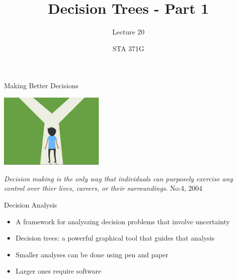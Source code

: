 \documentclass{beamer}\usepackage[]{graphicx}\usepackage[]{color}
\title{Decision Trees - Part 1}
\subtitle{Lecture 20}
\author{STA 371G}
\begin{document}
  
  

  \frame{\maketitle}



  \begin{darkframes}
    
    \begin{frame}{Making Better Decisions}
      \fontsize{10}{10}\selectfont
      \begin{center}
        \includegraphics[width=2in]{DecisionAnalysis.png} \\
      \end{center}
        \textit{Decision making is the only way that individuals can purposely
        exercise any control over thier lives, careers, or their surroundings.}
        No:4, 2004
      
      \lc %
    \end{frame}


    \begin{frame}[fragile]{Decision Analysis}
    \fontsize{10}{10}\selectfont
      \begin{itemize}[<+->]
        \item A framework for analyszing decision problems that involve uncertainty
        \item Decision trees: a powerful graphical tool that guides that analysis
        \item Smaller analyses can be done using pen and paper
        \item Larger ones require software 
        \end{itemize} 
    \end{frame}



\end{darkframes}
\end{document}
